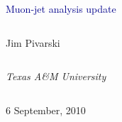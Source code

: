 \documentclass[compress]{beamer}
\begin{document}
\begin{frame}
\vfill
\begin{center}
\textcolor{darkblue}{\Large Muon-jet analysis update}

\vfill
\begin{columns}
\begin{center}
\large
Jim Pivarski
\end{center}
\end{columns}

\begin{columns}
\begin{center}
\scriptsize
{\it Texas A\&M University}
\end{center}
\end{columns}

\vfill
 6 September, 2010

\end{center}
\end{frame}


\small

\end{document}
